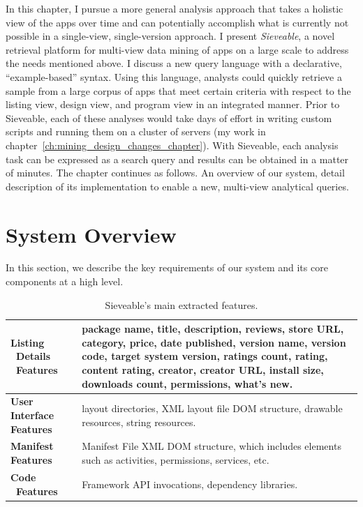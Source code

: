 In this chapter, I pursue a more general analysis approach that takes a holistic view of the apps over time and can potentially accomplish what is currently not possible in a single-view, single-version approach.
I present \emph{Sieveable}, a novel retrieval platform for multi-view data mining of apps on a large scale to address the needs mentioned above.
I discuss a new query language with a declarative, ``example-based'' syntax.
Using this language, analysts could quickly retrieve a sample from a large corpus of apps that meet certain criteria with respect to the listing view, design view, and program view in an integrated manner.
Prior to Sieveable, each of these analyses would take days of effort in writing custom scripts and running them on a cluster of servers (my work in chapter~\ref{ch:mining_design_changes_chapter}).
With Sieveable, each analysis task can be expressed as a search query and results can be obtained in a matter of minutes.
The chapter continues as follows. An overview of our system, detail description of its implementation to enable a new, multi-view analytical queries.


\section{System Overview}
In this section, we describe the key requirements of our system and its core components at a high level.

\begin{table}[t]
	\def\arraystretch{2}
	\centering
	\begin{tabular}{|>{\raggedright}p{2cm}|p{12.5cm}|}
		\hline
		\textbf{Listing \ Details \ Features} &
		package name, title, description, reviews, store URL, category, price, date published, version name, version code, target system version, ratings count, rating, content rating, creator, creator URL, install size, downloads count, permissions, what's new.\\
		\hline
		\textbf{User Interface Features} &
		layout directories, XML layout file DOM structure, drawable resources, string resources.\\
		\hline
		\textbf{Manifest Features}&
		Manifest File XML DOM structure, which includes elements such as activities, permissions, services, etc.\\
		\hline
		\textbf{Code \ Features} & 
		Framework API invocations, dependency libraries.\\
		\hline
	\end{tabular}
	\caption{Sieveable's main extracted features.}
	\label{tab:table_features}
\end{table}

